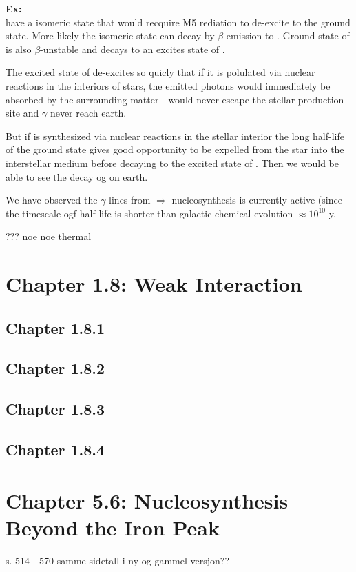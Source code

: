 \documentclass[a4paper,12pt]{article}
\begin{document}
\textbf{Ex:} \\
 have a isomeric state that would recquire M5 rediation to de-excite to the ground state. More likely the isomeric state can decay by $\beta$-emission to . Ground state of  is also $\beta$-unstable and decays to an excites state of .

The excited state of  de-excites so quicly that if it is polulated via nuclear reactions in the interiors of stars, the emitted photons would immediately be absorbed by the surrounding matter - would never escape the stellar production site and $\gamma$ never reach earth.

But if  is synthesized via nuclear reactions in the stellar interior the long half-life of the ground state gives good opportunity to be expelled from the star into the interstellar medium before decaying to the excited state of . Then we would be able to see the decay og  on earth. 

We have observed the $\gamma$-lines from  $\Rightarrow$ nucleosynthesis is currently active (since the timescale ogf  half-life is shorter than galactic chemical evolution $\approx 10^10$ y.

???
noe noe thermal 

\section*{Chapter 1.8: Weak Interaction}



\subsection*{Chapter 1.8.1}
\subsection*{Chapter 1.8.2}
\subsection*{Chapter 1.8.3}
\subsection*{Chapter 1.8.4}


\section*{Chapter 5.6: Nucleosynthesis Beyond the Iron Peak}
s. 514 -  570 samme sidetall i ny og gammel versjon??
\end{document}
